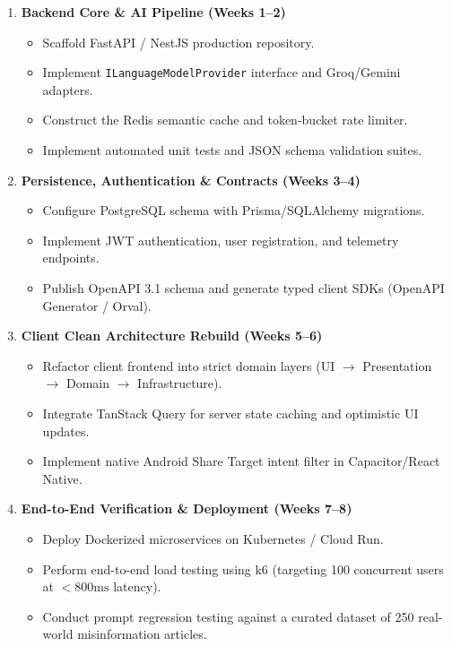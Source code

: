 \documentclass[11pt,a4paper]{report}
\begin{document}
\begin{enumerate}[label=\textbf{Milestone \arabic*:}, leftmargin=2.5cm]
    \item \textbf{Backend Core \& AI Pipeline (Weeks 1--2)}
    \begin{itemize}
        \item Scaffold FastAPI / NestJS production repository.
        \item Implement \texttt{ILanguageModelProvider} interface and Groq/Gemini adapters.
        \item Construct the Redis semantic cache and token-bucket rate limiter.
        \item Implement automated unit tests and JSON schema validation suites.
    \end{itemize}
    
    \item \textbf{Persistence, Authentication \& Contracts (Weeks 3--4)}
    \begin{itemize}
        \item Configure PostgreSQL schema with Prisma/SQLAlchemy migrations.
        \item Implement JWT authentication, user registration, and telemetry endpoints.
        \item Publish OpenAPI 3.1 schema and generate typed client SDKs (OpenAPI Generator / Orval).
    \end{itemize}
    
    \item \textbf{Client Clean Architecture Rebuild (Weeks 5--6)}
    \begin{itemize}
        \item Refactor client frontend into strict domain layers (UI $\rightarrow$ Presentation $\rightarrow$ Domain $\rightarrow$ Infrastructure).
        \item Integrate TanStack Query for server state caching and optimistic UI updates.
        \item Implement native Android Share Target intent filter in Capacitor/React Native.
    \end{itemize}
    
    \item \textbf{End-to-End Verification \& Deployment (Weeks 7--8)}
    \begin{itemize}
        \item Deploy Dockerized microservices on Kubernetes / Cloud Run.
        \item Perform end-to-end load testing using k6 (targeting 100 concurrent users at $< 800\text{ms}$ latency).
        \item Conduct prompt regression testing against a curated dataset of 250 real-world misinformation articles.
    \end{itemize}
\end{enumerate}
\end{document}
